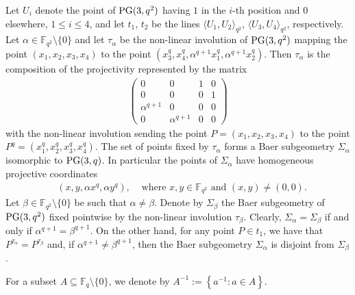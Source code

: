 \documentclass[11pt]{article}
\theoremstyle{definition}
\numberwithin{equation}{section}
\def\PG{{\rm PG}}
\def\F{{\mathbb F}}
\def\GL{{\rm GL}}
\begin{document}
Let $U_i$ denote the point of $\PG(3,q^2)$ having $1$ in the $i$-th position and $0$ elsewhere, $1 \le i \le 4$, and let $t_1$, $t_2$ be the lines $\langle U_1, U_{2} \rangle_{q^2}$, $\langle U_{3}, U_{4} \rangle_{q^2}$, respectively. Let $\alpha \in \F_{q^2} \setminus \{ 0 \}$ and let $\tau_{\alpha}$ be the non-linear involution of $\PG(3,q^2)$ mapping the point $\left(x_1, x_2, x_3, x_{4}\right)$ to the point $\left(x_{3}^q, x_{4}^q, \alpha^{q+1} x_1^q, \alpha^{q+1} x_{2}^q\right)$. Then $\tau_{\alpha}$ is the composition of the projectivity represented by the matrix 
\begin{align*}
\begin{pmatrix}
0 & 0 & 1 & 0 \\
0 & 0 & 0 & 1 \\
\alpha^{q+1} & 0 & 0 & 0 \\
0 & \alpha^{q+1} & 0 & 0 
\end{pmatrix}
\end{align*}
with the non-linear involution sending the point $P = \left(x_1, x_2, x_3 , x_{4}\right)$ to the point $P^q = \left(x_1^q, x_2^q, x_3^q, x_{4}^q\right)$. The set of points fixed by $\tau_{\alpha}$ forms a Baer subgeometry $\Sigma_{\alpha}$ isomorphic to $\PG(3, q)$. In particular the points of $\Sigma_{\alpha}$ have homogeneous projective coordinates 
\begin{align*}
& \left(x, y, \alpha x^q, \alpha y^q\right), & \mbox{ where } x, y \in \F_{q^2} \mbox{ and } (x, y) \ne (0, 0). 
\end{align*}
Let $\beta \in \F_{q^2} \setminus \{ 0 \}$ be such that $\alpha \ne \beta$. Denote by $\Sigma_{\beta}$ the Baer subgeometry of $\PG(3,q^2)$ fixed pointwise by the non-linear involution $\tau_{\beta}$. Clearly, $\Sigma_{\alpha} = \Sigma_{\beta}$ if and only if $\alpha^{q+1} = \beta^{q+1}$. On the other hand, for any point $P \in t_1$, we have that $P^{\tau_{\alpha}} = P^{\tau_{\beta}}$ and, if $\alpha^{q+1} \ne \beta^{q+1}$, then the Baer subgeometry $\Sigma_{\alpha}$ is disjoint from $\Sigma_{\beta}$. 

For a subset $A \subseteq \F_q \setminus \{0\}$, we denote by $A^{-1}:=\left\{a^{-1}\colon a \in A\right\}$.
\end{document}
